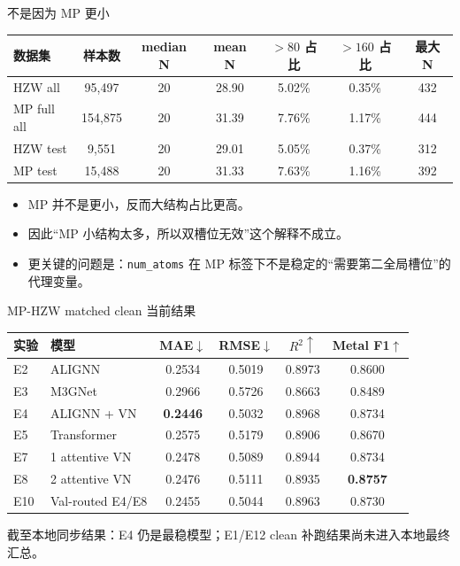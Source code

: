 \documentclass[aspectratio=169]{beamer}
\begin{document}
\begin{frame}{不是因为 MP 更小}
\scriptsize
\centering
\setlength{\tabcolsep}{4pt}
\begin{tabular}{l c c c c c c}
\toprule
数据集 & 样本数 & median N & mean N & $>80$ 占比 & $>160$ 占比 & 最大 N \\
\midrule
HZW all & 95,497 & 20 & 28.90 & 5.02\% & 0.35\% & 432 \\
MP full all & 154,875 & 20 & 31.39 & 7.76\% & 1.17\% & 444 \\
HZW test & 9,551 & 20 & 29.01 & 5.05\% & 0.37\% & 312 \\
MP test & 15,488 & 20 & 31.33 & 7.63\% & 1.16\% & 392 \\
\bottomrule
\end{tabular}

\vspace{2mm}
\small
\begin{itemize}
  \item MP 并不是更小，反而大结构占比更高。
  \item 因此“MP 小结构太多，所以双槽位无效”这个解释不成立。
  \item 更关键的问题是：\texttt{num\_atoms} 在 MP 标签下不是稳定的“需要第二全局槽位”的代理变量。
\end{itemize}
\end{frame}

\begin{frame}{MP-HZW matched clean 当前结果}
\scriptsize
\centering
\begin{tabular}{l l c c c c}
\toprule
实验 & 模型 & MAE$\downarrow$ & RMSE$\downarrow$ & $R^2\uparrow$ & Metal F1$\uparrow$ \\
\midrule
E2 & ALIGNN & 0.2534 & 0.5019 & 0.8973 & 0.8600 \\
E3 & M3GNet & 0.2966 & 0.5726 & 0.8663 & 0.8489 \\
E4 & ALIGNN + VN & \textbf{0.2446} & 0.5032 & 0.8968 & 0.8734 \\
E5 & Transformer & 0.2575 & 0.5179 & 0.8906 & 0.8670 \\
E7 & 1 attentive VN & 0.2478 & 0.5089 & 0.8944 & 0.8734 \\
E8 & 2 attentive VN & 0.2476 & 0.5111 & 0.8935 & \textbf{0.8757} \\
E10 & Val-routed E4/E8 & 0.2455 & 0.5044 & 0.8963 & 0.8730 \\
\bottomrule
\end{tabular}

\vspace{1mm}
\small
截至本地同步结果：E4 仍是最稳模型；E1/E12 clean 补跑结果尚未进入本地最终汇总。
\end{frame}
\end{document}
